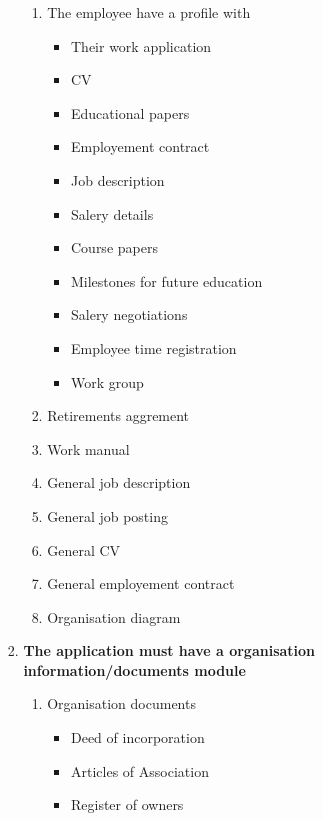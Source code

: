 \begin{enumerate}
\begin{enumerate}
\begin{enumerate}
            \begin{enumerate}
                \item The employee have a profile with
                \begin{itemize}\textbf{\textit{skal skrives om til flydende tekst}}
                    \item Their work application
                    \item CV
                    \item Educational papers
                    \item Employement contract
                    \item Job description
                    \item Salery details
                    \item Course papers
                    \item Milestones for future education
                    \item Salery negotiations
                    \item Employee time registration
                    \item Work group
                \end{itemize}
                \item Retirements aggrement
                \item Work manual
                \item General job description
                \item General job posting
                \item General CV
                \item General employement contract
                \item Organisation diagram
            \end{enumerate}
            \item \textbf{The application must have a organisation information/documents module}
            \begin{enumerate}
                \item Organisation documents
                \begin{itemize}\textbf{\textit{skal skrives om til flydende tekst}}
                    \item Deed of incorporation
                    \item Articles of Association
                    \item Register of owners

\end{itemize}
\end{enumerate}
\end{enumerate}
\end{enumerate}
\end{enumerate}
